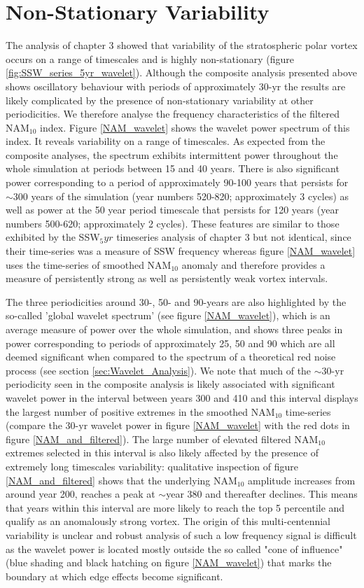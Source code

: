 \section{Non-Stationary Variability}
The analysis of chapter 3 showed that variability of the stratospheric polar vortex occurs on a range of timescales and is highly non-stationary (figure \ref{fig:SSW_series_5yr_wavelet}). Although the composite analysis presented above shows oscillatory behaviour with periods of approximately 30-yr the results are likely complicated by the presence of  non-stationary variability at other periodicities. We therefore analyse the frequency characteristics of the filtered NAM$_{10}$ index. Figure \ref{NAM_wavelet} shows the wavelet power spectrum of this index. It reveals variability on a range of timescales. As expected from the composite analyses, the spectrum exhibits intermittent power throughout the whole simulation at periods between 15 and 40 years. There is also significant power corresponding to a period of approximately 90-100 years that persists for $\sim$300 years of the simulation (year numbers 520-820; approximately 3 cycles) as well as power at the 50 year period timescale that persists for 120 years (year numbers 500-620; approximately 2 cycles). These features are similar to those exhibited by the SSW$_5yr$ timeseries analysis of chapter 3 but not identical, since their time-series was a measure of SSW frequency whereas figure \ref{NAM_wavelet} uses the time-series of smoothed NAM${_10}$ anomaly and therefore provides a measure of persistently strong as well as persistently weak vortex intervals.

The three periodicities  around 30-, 50- and 90-years are also highlighted by the so-called 'global wavelet spectrum' (see figure \ref{NAM_wavelet}), which is an average measure of power over the whole simulation, and shows three peaks in power corresponding to periods of approximately 25, 50 and 90 which are all deemed significant when compared to the spectrum of a theoretical red noise process (see section \ref{sec:Wavelet_Analysis}). We note that much of the $\sim$30-yr periodicity seen in the composite analysis is likely associated with significant wavelet power in the interval between years 300 and 410 and this interval displays the largest number of positive extremes in the smoothed NAM$_{10}$ time-series (compare the 30-yr wavelet power in figure \ref{NAM_wavelet} with the red dots in figure \ref{NAM_and_filtered}). The large number of elevated filtered NAM$_{10}$ extremes selected in this interval is also likely affected by the presence of extremely long timescales variability: qualitative inspection of figure \ref{NAM_and_filtered} shows that the underlying NAM$_{10}$ amplitude increases from around year 200, reaches a peak at $\sim$year 380 and thereafter declines. This means that years within this interval are more likely to reach the top 5 percentile and qualify as an anomalously strong vortex. The origin of this multi-centennial variability is unclear and robust analysis of such a low frequency signal is difficult as the wavelet power is located mostly outside the so called "cone of influence" (blue shading and black hatching on figure \ref{NAM_wavelet}) that marks the boundary at which edge effects become significant. 

